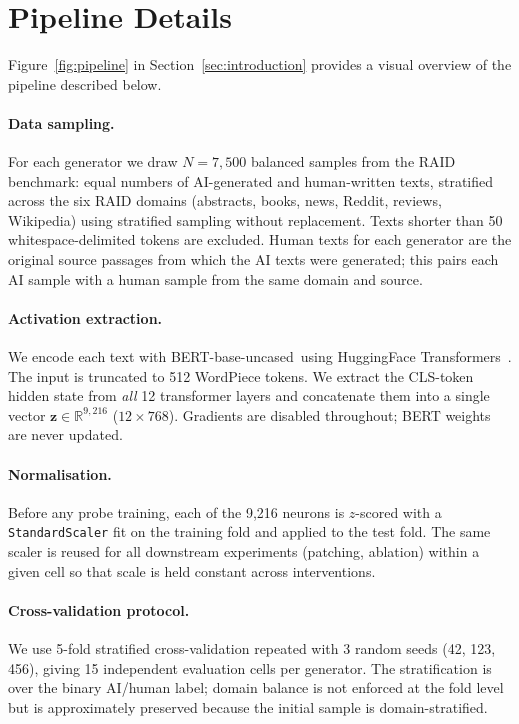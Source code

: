 \documentclass[11pt]{article}
\newcommand{\bertbase}{BERT-base-uncased\xspace}
\begin{document}


\appendix

\section{Pipeline Details}
\label{app:pipeline}

Figure~\ref{fig:pipeline} in Section~\ref{sec:introduction} provides a visual overview of the pipeline described below.

\paragraph{Data sampling.}
For each generator we draw $N = 7{,}500$ balanced samples from the RAID benchmark: equal numbers of AI-generated and human-written texts, stratified across the six RAID domains (abstracts, books, news, Reddit, reviews, Wikipedia) using stratified sampling without replacement. Texts shorter than 50 whitespace-delimited tokens are excluded. Human texts for each generator are the original source passages from which the AI texts were generated; this pairs each AI sample with a human sample from the same domain and source.

\paragraph{Activation extraction.}
We encode each text with \bertbase\ using HuggingFace Transformers~\citep{wolf2020transformers}. The input is truncated to 512 WordPiece tokens. We extract the CLS-token hidden state from \emph{all} 12 transformer layers and concatenate them into a single vector $\mathbf{z} \in \mathbb{R}^{9{,}216}$ ($12 \times 768$). Gradients are disabled throughout; BERT weights are never updated.

\paragraph{Normalisation.}
Before any probe training, each of the 9{,}216 neurons is $z$-scored with a \texttt{StandardScaler} fit on the training fold and applied to the test fold. The same scaler is reused for all downstream experiments (patching, ablation) within a given cell so that scale is held constant across interventions.

\paragraph{Cross-validation protocol.}
We use 5-fold stratified cross-validation repeated with 3 random seeds (42, 123, 456), giving 15 independent evaluation cells per generator. The stratification is over the binary AI/human label; domain balance is not enforced at the fold level but is approximately preserved because the initial sample is domain-stratified.
\end{document}
